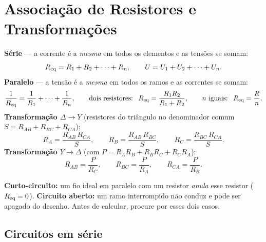 \section{Associação de Resistores e Transformações}

\begin{conceito}
\textbf{Série} --- a corrente é a \emph{mesma} em todos os elementos e as tensões
se somam:
\[
R_{\mathrm{eq}} = R_1+R_2+\dots+R_n ,\qquad U = U_1+U_2+\dots+U_n .
\]
\textbf{Paralelo} --- a tensão é a \emph{mesma} em todos os ramos e as correntes
se somam:
\[
\frac{1}{R_{\mathrm{eq}}}=\frac{1}{R_1}+\dots+\frac{1}{R_n},\qquad
\text{dois resistores: }\ R_{\mathrm{eq}}=\frac{R_1R_2}{R_1+R_2},\qquad
\text{$n$ iguais: }\ R_{\mathrm{eq}}=\frac{R}{n}.
\]
\textbf{Transformação $\Delta \to Y$} (resistores do triângulo no denominador comum
$S=R_{AB}+R_{BC}+R_{CA}$):
\[
R_A=\frac{R_{AB}\,R_{CA}}{S},\qquad
R_B=\frac{R_{AB}\,R_{BC}}{S},\qquad
R_C=\frac{R_{BC}\,R_{CA}}{S}.
\]
\textbf{Transformação $Y \to \Delta$} (com $P=R_AR_B+R_BR_C+R_CR_A$):
\[
R_{AB}=\frac{P}{R_C},\qquad R_{BC}=\frac{P}{R_A},\qquad R_{CA}=\frac{P}{R_B}.
\]
\end{conceito}

\begin{atencao}
\textbf{Curto-circuito:} um fio ideal em paralelo com um resistor \emph{anula} esse
resistor ($R_{\mathrm{eq}} = 0$). \quad
\textbf{Circuito aberto:} um ramo interrompido não conduz e pode ser apagado do
desenho. Antes de calcular, procure por esses dois casos.
\end{atencao}

\legendaniveis

\subsection{Circuitos em série}

\blocofixacao

